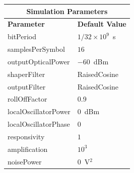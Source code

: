 \begin{refsection}
\begin{table}[H]
	\begin{tabular}{|l|l|}
		\hline
		\multicolumn{2}{|c|}{ \textbf{Simulation Parameters} } \\
		\hline
		\textbf{Parameter}     & \textbf{Default Value}                                     \\\hline
		bitPeriod              & $1/32\times10^9$~s														\\\hline
		samplesPerSymbol       & $16$                                                       \\\hline
		outputOpticalPower     & $-60$~dBm 													\\ \hline
		shaperFilter	       & RaisedCosine												\\ \hline
		outputFilter		   & RaisedCosine												\\ \hline
		rollOffFactor		   & 0.9														\\ \hline
				localOscillatorPower   & $0$~dBm                                                    \\ \hline
				localOscillatorPhase   & $0$                                                        \\ \hline
				responsivity           & $1$                                                        \\ \hline
				amplification          & $10^3$                                                     \\ \hline
				noisePower   & $0$~V$^2$                             					\\ \hline

\end{tabular}
\end{table}
\end{refsection}
